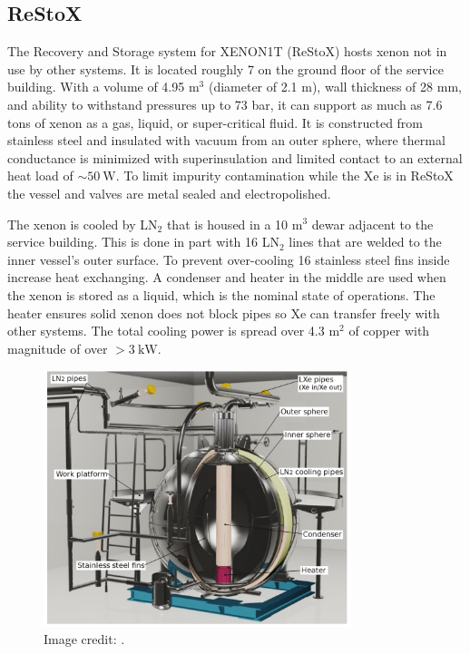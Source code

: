\subsection{ReStoX}
\label{subsec:xenon1t_restox}
The Recovery and Storage system for XENON1T (ReStoX) hosts xenon not in use by other systems.  It is located roughly 7 on the ground floor of the
service building.  With a volume of 4.95 m$^{3}$
(diameter of 2.1 m), wall thickness of 28 mm, and ability to withstand pressures up to 73 bar, it can support as much as 7.6 tons of xenon
as a gas, liquid, or super-critical fluid.  It is constructed from stainless steel and insulated with vacuum from an outer sphere, where
thermal conductance is minimized with superinsulation and limited contact to an external heat load of ${\sim}50\ \mathrm{W}$.  To limit
impurity contamination while the Xe is in ReStoX the vessel and valves are metal sealed and electropolished.

The xenon is cooled by LN$_2$ that is housed in a 10 m$^3$ dewar adjacent to the service building.  This is done in part with 16 LN$_2$
lines that are welded to the inner vessel's outer surface.  To prevent over-cooling 16 stainless steel fins inside increase heat
exchanging.  A condenser and heater in the middle are used when the xenon is stored as a liquid, which is the nominal state of
operations.  The heater ensures solid xenon does not block pipes so Xe can transfer freely with other systems.  The total cooling power is
spread over 4.3 m$^2$ of copper with magnitude of over $>3\ \mathrm{kW}$.

\begin{figure}
\centering
\includegraphics[width=0.8\textwidth]{ReStoX}
\caption{Image credit: .}
\label{fig:xenon1t_restox_pic}
\end{figure}


